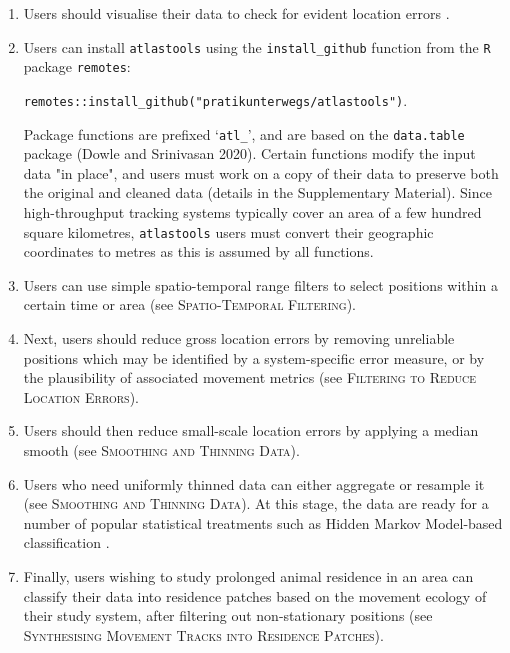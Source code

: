 \documentclass[10pt,paper=a4,headings=standardclasses
]{scrartcl}
\begin{document}
\begin{enumerate}
    
    \item Users should visualise their data to check for evident location errors \citep{slingsby2016}.
    \item Users can install \texttt{atlastools} using the \texttt{install\_github} function from the \texttt{R} package \texttt{remotes}:
    
    \texttt{remotes::install\_github("pratikunterwegs/atlastools")}.
    
    Package functions are prefixed `\texttt{atl\_}', and are based on the \texttt{data.table} package (Dowle and Srinivasan 2020).
    Certain functions modify the input data "in place", and users must work on a copy of their data to preserve both the original and cleaned data (details in the Supplementary Material).
    Since high-throughput tracking systems typically cover an area of a few hundred square kilometres, \texttt{atlastools} users must convert their geographic coordinates to metres as this is assumed by all functions.
    \item Users can use simple spatio-temporal range filters to select positions within a certain time or area (see \textsc{Spatio-Temporal Filtering}).
    \item Next, users should reduce gross location errors by removing unreliable positions which may be identified by a system-specific error measure, or by the plausibility of associated movement metrics (see \textsc{Filtering to Reduce Location Errors}).
    \item Users should then reduce small-scale location errors by applying a median smooth (see \textsc{Smoothing and Thinning Data}).
    \item Users who need uniformly thinned data can either aggregate or resample it (see \textsc{Smoothing and Thinning Data}).
    At this stage, the data are ready for a number of popular statistical treatments such as Hidden Markov Model-based classification \citep{michelot2016,langrock2012}.
    \item Finally, users wishing to study prolonged animal residence in an area can classify their data into residence patches based on the movement ecology of their study system, after filtering out non-stationary positions (see \textsc{Synthesising Movement Tracks into Residence Patches}).
    
\end{enumerate}
\end{document}

